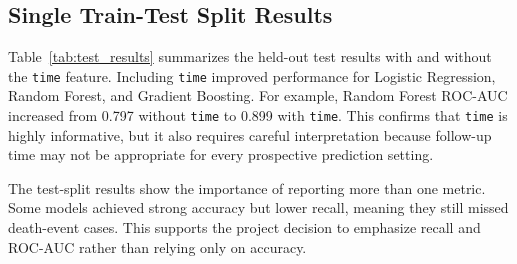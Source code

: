 \documentclass{article}
\begin{document}
\subsection{Single Train-Test Split Results}

Table~\ref{tab:test_results} summarizes the held-out test results with and without the \texttt{time} feature. Including \texttt{time} improved performance for Logistic Regression, Random Forest, and Gradient Boosting. For example, Random Forest ROC-AUC increased from 0.797 without \texttt{time} to 0.899 with \texttt{time}. This confirms that \texttt{time} is highly informative, but it also requires careful interpretation because follow-up time may not be appropriate for every prospective prediction setting.

\begin{table}[!htbp]
\centering
\caption{Held-out test performance with and without \texttt{time}.}
\label{tab:test_results}
\scriptsize
{}
\end{table}

The test-split results show the importance of reporting more than one metric. Some models achieved strong accuracy but lower recall, meaning they still missed death-event cases. This supports the project decision to emphasize recall and ROC-AUC rather than relying only on accuracy.
\end{document}
